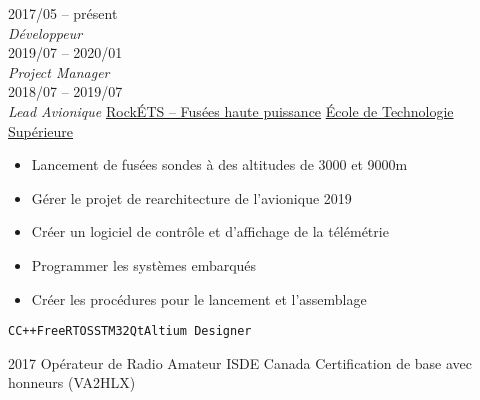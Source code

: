 \documentclass[9pt]{developercv} %
\begin{document}
\begin{minipage}[t]{0.8\textwidth}


\begin{entrylist}
	\entry
		{2017/05 -- présent\\{\small\emph{Développeur}}\\2019/07 -- 2020/01\\{\small\emph{Project Manager}}\\2018/07 -- 2019/07\\{\small\emph{Lead Avionique}}}
		{\href{https://clubrockets.ca/}{RockÉTS -- Fusées haute puissance}}
		{\href{https://clubrockets.ca/}{École de Technologie Supérieure}}
		{
			\vspace{-14pt}
			\begin{itemize}
				\renewcommand{\labelitemi}{\raisebox{.45ex}{\rule{.6ex}{.6ex}}}
				\setlength\itemsep{-1pt}
				\item Lancement de fusées sondes à des altitudes de 3000 et 9000m
				\item Gérer le projet de rearchitecture de l'avionique 2019
				\item Créer un logiciel de contrôle et d'affichage de la télémétrie
				\item Programmer les systèmes embarqués
				\item Créer les procédures pour le lancement et l'assemblage
			\end{itemize}
			\vspace{-4pt}
			\texttt{C}\slashsep\texttt{C++}\slashsep\texttt{FreeRTOS}\slashsep\texttt{STM32}\slashsep\texttt{Qt}\slashsep\texttt{Altium Designer}
		}
\end{entrylist}



\begin{entrylist}
	\entry
		{2017}
		{Opérateur de Radio Amateur}
		{ISDE Canada}
		{
			Certification de base avec honneurs (VA2HLX)
		}
\end{entrylist}
\end{minipage}
\begin{minipage}[t]{0.02\textwidth}
	\hfill
\end{minipage}
\end{document}
